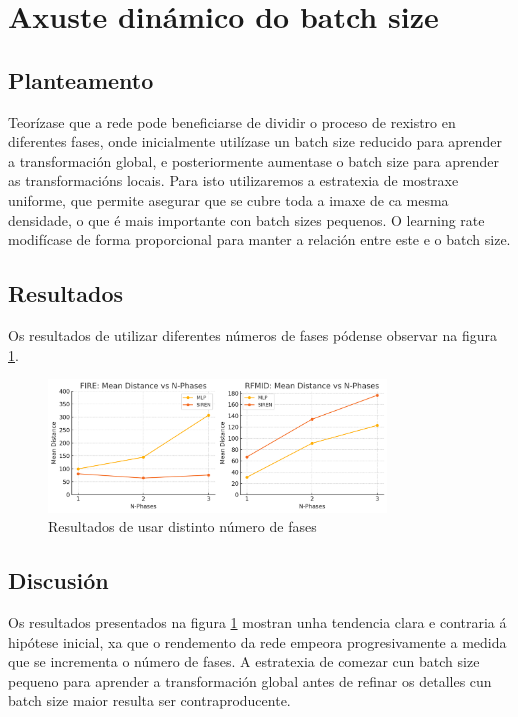\section{Axuste dinámico do batch size}
\label{sec:Dynamic batch size}

\subsection{Planteamento}
\label{subsec:Planteamento-phases}

Teorízase que a rede pode beneficiarse de dividir o proceso de rexistro en diferentes fases, onde inicialmente utilízase un batch size reducido para aprender a transformación global, e posteriormente aumentase o batch size para aprender as transformacións locais.
Para isto utilizaremos a estratexia de mostraxe uniforme, que permite asegurar que se cubre toda a imaxe de ca mesma densidade, o que é mais importante con batch sizes pequenos. O learning rate modifícase de forma proporcional para manter a relación entre este e o batch size.

\subsection{Resultados}
\label{subsec:Resultados-phases}

Os resultados de utilizar diferentes números de fases pódense observar na figura \ref{fig:nphases}.
\begin{figure}[ht]
    \centering
    \includegraphics[width=0.8\textwidth]{imaxes/lottery/nphases.png}
    \caption{Resultados de usar distinto número de fases}
    \label{fig:nphases}
\end{figure}


\subsection{Discusión}
\label{subsec:Discusion-phases}

Os resultados presentados na figura \ref{fig:nphases} mostran unha tendencia clara e contraria á hipótese inicial, xa que o rendemento da rede empeora progresivamente a medida que se incrementa o número de fases. A estratexia de comezar cun batch size pequeno para aprender a transformación global antes de refinar os detalles cun batch size maior resulta ser contraproducente.

